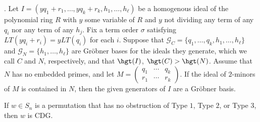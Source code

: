 \begin{lemma}\label{lem:mainApp}\cite[Corollary 4.13]{KR}.  
Let $I = ( yq_1+r_1,\dots, yq_k+r_k,h_1,\dots, h_\ell )$ be a homogenous ideal of the polynomial ring $R$ with $y$ some variable of $R$ and $y$ not dividing any term of any $q_i$ nor any term of any $h_j$. Fix a term order $\sigma$ satisfying $LT(yq_i+r_i) = yLT(q_i)$ for each $i$.   Suppose that $\mathcal{G}_C = \{q_1,\dots, q_k,h_1,\dots, h_\ell\}$ and $\mathcal{G}_N = \{h_1,\dots, h_\ell\}$ are Gr\"obner bases for the ideals they generate, which we call $C$ and $N$, respectively, and that $\hgt(I)$, $\hgt(C)>\hgt(N)$.  Assume that $N$ has no embedded primes, and let $M = \begin{pmatrix}
q_1& \cdots & q_k\\
r_1& \cdots & r_k
\end{pmatrix}.$ If the ideal of $2$-minors of $M$ is contained in $N$, then the given generators of $I$ are a Gr\"obner basis.
\end{lemma}

\begin{theorem}\label{thm:if}
If $w \in S_n$ is a permutation that has no obstruction of Type $1$, Type  $2$, or Type $3$, then $w$ is CDG.
\end{theorem}

